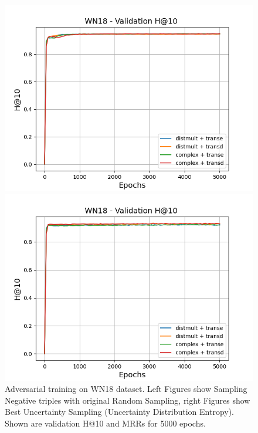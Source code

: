\begin{figure}
\begin{minipage}{.5\textwidth}
    \end{minipage}
    \begin{minipage}{.5\textwidth}
      \centering
      \includegraphics[width=0.9\linewidth]{figures/results/gan_train/not_pretrained/random/wn18/gan_train_random_wn18_hit10s.png}
    \end{minipage}%
    \begin{minipage}{.5\textwidth}
      \centering
      \includegraphics[width=0.9\linewidth]{figures/results/gan_train/not_pretrained/uncertainty/max_distribution/entropy/wn18/gan_train_uncertainty_wn18_hit10s.png}
    \end{minipage}%
    \caption{Adversarial training on \textsc{WN18} dataset. 
    Left Figures show Sampling Negative triples with original Random Sampling, right Figures show Best Uncertainty Sampling (Uncertainty Distribution Entropy).
    Shown are validation H@10 and MRRs for 5000 epochs.}
    \label{fig:advtrain_wn18_random_vs_uncertainty}
\end{figure}